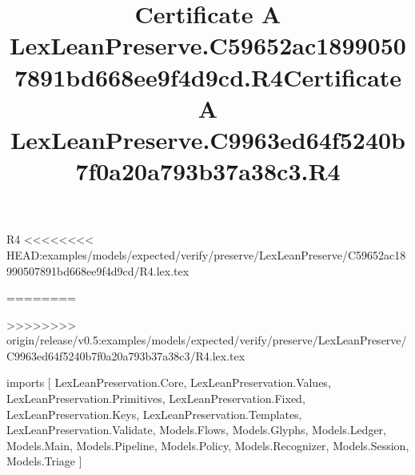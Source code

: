 \begin{lexlean}{R4}
<<<<<<<< HEAD:examples/models/expected/verify/preserve/LexLeanPreserve/C59652ac18990507891bd668ee9f4d9cd/R4.lex.tex
\title{Certificate A LexLeanPreserve.C59652ac18990507891bd668ee9f4d9cd.R4}
========
\title{Certificate A LexLeanPreserve.C9963ed64f5240b7f0a20a793b37a38c3.R4}
>>>>>>>> origin/release/v0.5:examples/models/expected/verify/preserve/LexLeanPreserve/C9963ed64f5240b7f0a20a793b37a38c3/R4.lex.tex
\begin{coremodule}
imports [
  LexLeanPreservation.Core,
  LexLeanPreservation.Values,
  LexLeanPreservation.Primitives,
  LexLeanPreservation.Fixed,
  LexLeanPreservation.Keys,
  LexLeanPreservation.Templates,
  LexLeanPreservation.Validate,
  Models.Flows,
  Models.Glyphs,
  Models.Ledger,
  Models.Main,
  Models.Pipeline,
  Models.Policy,
  Models.Recognizer,
  Models.Session,
  Models.Triage
]


\end{coremodule}
\end{lexlean}
